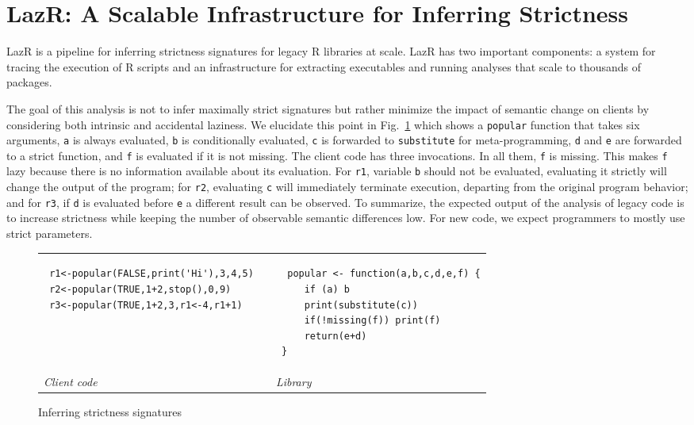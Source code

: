 \documentclass[review,creen,acmsmall]{acmart}
\renewcommand{\c}[1]{\lstinline |#1|\xspace}
\newcommand{\lazr}{{\sf LazR}\xspace}
\begin{document}
\section{LazR: A Scalable Infrastructure for Inferring Strictness}\label{sec:lazr}

\lazr is a pipeline for inferring strictness signatures for legacy R libraries
at scale. \lazr has two important components: a system for tracing the execution
of R scripts and an infrastructure for extracting executables and running
analyses that scale to thousands of packages.


The goal of this analysis is not to infer maximally strict signatures but rather
minimize the impact of semantic change on clients by considering both intrinsic
and accidental laziness. We elucidate this point in Fig.~\ref{iss} which
shows a \c{popular} function that takes six arguments, \c{a} is always
evaluated, \c{b} is conditionally evaluated, \c{c} is forwarded to
\c{substitute} for meta-programming, \c{d} and \c{e} are forwarded to a
strict function, and \c{f} is evaluated if it is not missing. The client code
has three invocations. In all them, \c{f} is missing. This makes \c{f}
lazy because there is no information available about its evaluation. For \c{r1},
variable \c b should not be evaluated, evaluating it strictly will change the
output of the program; for \c{r2}, evaluating \c{c} will immediately
terminate execution, departing from the original program behavior; and for
\c{r3}, if \c{d} is evaluated before \c{e} a different result can be observed.
To summarize, the expected output of the analysis of legacy code is to increase
strictness while keeping the number of observable semantic differences low. For
new code, we expect programmers to mostly use strict parameters.

\begin{figure}[!h]
  \begin{tabular}{lll}
    \begin{minipage}{6cm}
\begin{lstlisting}
 r1<-popular(FALSE,print('Hi'),3,4,5)
 r2<-popular(TRUE,1+2,stop(),0,9)
 r3<-popular(TRUE,1+2,3,r1<-4,r1+1)
\end{lstlisting}
    \end{minipage}
    &&
       \begin{minipage}{6cm}
\begin{lstlisting}
  popular <- function(a,b,c,d,e,f) {
     if (a) b
     print(substitute(c))
     if(!missing(f)) print(f)
     return(e+d)
 }
\end{lstlisting}
       \end{minipage}\\
{\it Client code}&& {\it Library}
  \end{tabular}%
  \caption{Inferring strictness signatures}\label{iss} %
\end{figure}
\end{document}
